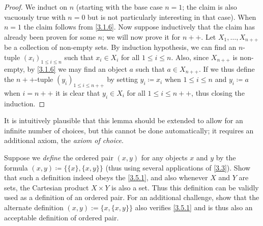 \begin{proof}
  We induct on \(n\) (starting with the base case \(n = 1\); the claim is also vacuously true with \(n = 0\) but is not particularly interesting in that case).
  When \(n = 1\) the claim follows from \cref{3.1.6}.
  Now suppose inductively that the claim has already been proven for some \(n\);
  we will now prove it for \(n++\).
  Let \(X_1, \dots, X_{n++}\) be a collection of non-empty sets.
  By induction hypothesis, we can find an \(n\)-tuple \((x_i)_{1 \leq i \leq n}\) such that \(x_i \in X_i\) for all \(1 \leq i \leq n\).
  Also, since \(X_{n++}\) is non-empty, by \cref{3.1.6} we may find an object \(a\) such that \(a \in X_{n++}\).
  If we thus define the \(n++\)-tuple \((y_i)_{1 \leq i \leq n++}\) by setting \(y_i \coloneqq x_i\) when \(1 \leq i \leq n\) and \(y_i \coloneqq a\) when \(i = n++\) it is clear that \(y_i \in X_i\) for all \(1 \leq i \leq n++\), thus closing the induction.
\end{proof}

\begin{remark}\label{3.5.13}
  It is intuitively plausible that this lemma should be extended to allow for an infinite number of choices, but this cannot be done automatically;
  it requires an additional axiom, the \emph{axiom of choice}.
\end{remark}

\exercisesection

\begin{exercise}\label{ex 3.5.1}
  Suppose we \emph{define} the ordered pair \((x, y)\) for any objects \(x\) and \(y\) by the formula \((x, y) \coloneqq \{\{x\}, \{x, y\}\}\)
  (thus using several applications of \cref{3.3}).
  Show that such a definition indeed obeys the \cref{3.5.1}, and also whenever \(X\) and \(Y\) are sets, the Cartesian product \(X \times Y\) is also a set.
  Thus this definition can be validly used as a definition of an ordered pair.
  For an additional challenge, show that the alternate definition \((x, y) := \{x, \{x, y\}\}\) also verifies \cref{3.5.1} and is thus also an acceptable definition of ordered pair.
\end{exercise}

